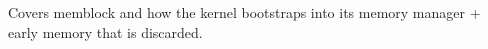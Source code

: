 Covers memblock and how the kernel bootstraps into its memory manager + early
memory that is discarded.\\
